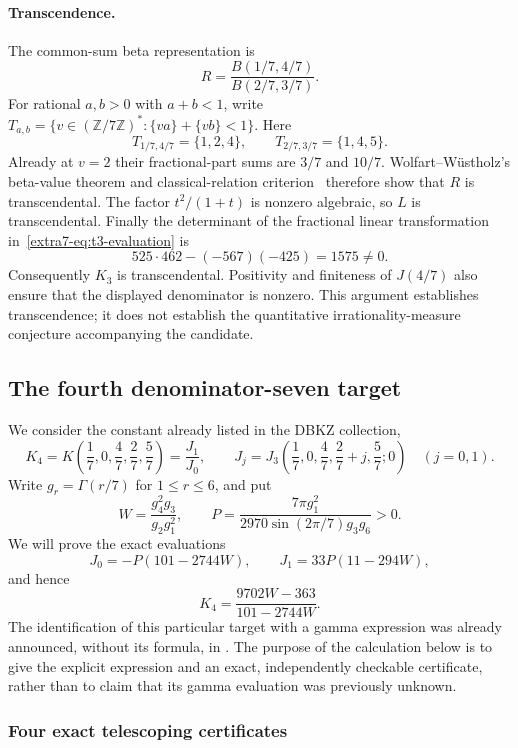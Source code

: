 \documentclass[11pt,a4paper]{article}
\theoremstyle{definition}
\theoremstyle{remark}
\numberwithin{equation}{section}
\begin{document}
\paragraph{Transcendence.}
The common-sum beta representation is
\[
 R=\frac{B(1/7,4/7)}{B(2/7,3/7)}.
\]
For rational $a,b>0$ with $a+b<1$, write
$T_{a,b}=\{v\in(\mathbb Z/7\mathbb Z)^*:
\{va\}+\{vb\}<1\}$.  Here
\[
 T_{1/7,4/7}=\{1,2,4\},\qquad
 T_{2/7,3/7}=\{1,4,5\}.
\]
Already at $v=2$ their fractional-part sums are $3/7$ and $10/7$.
Wolfart--W\"ustholz's beta-value theorem and classical-relation
criterion~\cite[Satz~4 and Proposition~2]{dbkz-ww} therefore show that
$R$ is transcendental.  The factor $t^2/(1+t)$ is nonzero algebraic,
so $L$ is transcendental.  Finally the determinant of the fractional
linear transformation in~\eqref{extra7-eq:t3-evaluation} is
\[
 525\cdot462-(-567)(-425)=1575\ne0.
\]
Consequently $K_3$ is transcendental.  Positivity and finiteness of
$J(4/7)$ also ensure that the displayed denominator is nonzero.
This argument establishes transcendence; it does not establish the
quantitative irrationality-measure conjecture accompanying the candidate.

\subsection{The fourth denominator-seven target}

We consider the constant already listed in the DBKZ collection,
\[
 K_4=K\left(\frac17,0,\frac47,\frac27,\frac57\right)
       =\frac{J_1}{J_0},\qquad
 J_j=J_3\left(\frac17,0,\frac47,\frac27+j,\frac57;0\right)
 \quad(j=0,1).
\]
Write $g_r=\Gamma(r/7)$ for $1\leq r\leq6$, and put
\[
 W=\frac{g_4^2g_3}{g_2g_1^2},\qquad
 P=\frac{7\pi g_1^2}{2970\sin(2\pi/7)g_3g_6}>0.
\]
We will prove the exact evaluations
\begin{equation}\label{extra7-eq:target4-J}
 J_0=-P(101-2744W),\qquad
 J_1=33P(11-294W),
\end{equation}
and hence
\begin{equation}\label{extra7-eq:target4-K}
 \boxed{K_4=\frac{9702W-363}{101-2744W}.}
\end{equation}
The identification of this particular target with a gamma expression was
already announced, without its formula, in \cite[p.~3]{extra8-zudilin}. The purpose
of the calculation below is to give the explicit expression and an exact,
independently checkable certificate, rather than to claim that its gamma
evaluation was previously unknown.

\subsubsection{Four exact telescoping certificates}
\end{document}
